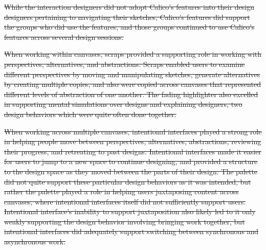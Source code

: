 \documentclass[12pt,fleqn]{ucithesis}
\providecommand{\DIFdeltex}[1]{{\protect\color{red}\sout{#1}}}                      %
\providecommand{\DIFdel}[1]{\texorpdfstring{\DIFdeltex{#1}}{}} %
\begin{document}
\DIFdel{While the interaction designers did not adopt Calico's features into their design designers pertaining to navigating their sketches, Calico's features did support the groups who did use the features, and those groups continued to use Calico's features across several design sessions. 
}%

\DIFdel{When working within canvases, scraps provided a supporting role in working with perspectives, alternatives, and abstractions. Scraps enabled users to examine different perspectives by moving and manipulating sketches, generate alternatives by creating multiple copies, and also were copied across canvases that represented different levels of abstraction of one another. The fading highlighter also excelled in supporting mental simulations over designs and explaining designers, two design behaviors which were quite often done together.
}%

\DIFdel{When working across multiple canvases, intentional interfaces played a strong role in helping people move between perspectives, alternatives, abstractions, reviewing their progress, and retreating to past designs. Intentional interfaces made it easier for users to jump to a new space to continue designing, and provided a structure to the design space as they moved between the parts of their design. The palette did not quite support these particular design behaviors as it was intended, but rather the palette played a role in helping users juxtaposing content across canvases, where intentional interfaces itself did not sufficiently support users. Intentional interface's inability to support juxtaposition also likely led to it only weakly supporting the design behavior involving bringing work together, but intentional interfaces did adequately support switching between synchronous and asynchronous work. 
}%

\end{document}

